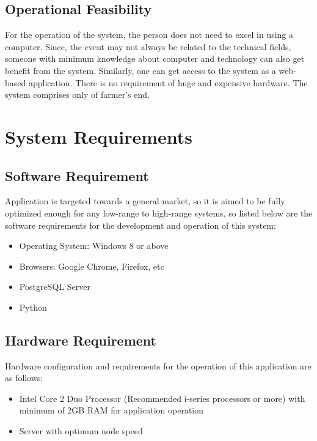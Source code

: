 \subsection{Operational Feasibility}
For the operation of the system, the person does
not need to excel in using a computer. Since, the event
may not always be related to the technical fields, someone
with minimum knowledge about computer and technology can also get
benefit from the system. Similarly, one can get access to the system
as a web-based application. There is no requirement of huge and expensive hardware.
The system comprises only of farmer’s end.

\section{System Requirements}

\subsection{Software Requirement}
Application is targeted towards a general market,
so it is aimed to be fully optimized enough for any low-range to
high-range systems, so listed below are
the software requirements for the development and operation of this system:
\vspace{-18pt}
\begin{itemize}
	\item Operating System: Windows 8 or above
	\item Browsers: Google Chrome, Firefox, etc
	\item PostgreSQL Server
	\item Python
\end{itemize}

\subsection{Hardware Requirement}
Hardware configuration and requirements for the
operation of this application are as follows:
\vspace{-18pt}
\begin{itemize}
	\item Intel Core 2 Duo Processor (Recommended i-series processors or more) with minimum of 2GB RAM for application operation
	\item Server with optimum node speed
\end{itemize}



